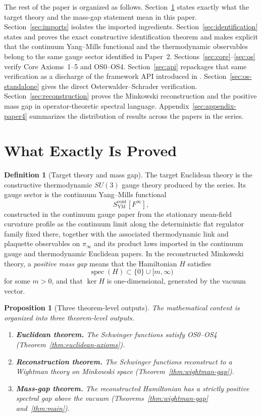 \documentclass[11pt]{article}
\newtheorem{proposition}[theorem]{Proposition}
\theoremstyle{definition}
\newtheorem{definition}[theorem]{Definition}
\theoremstyle{remark}
\newcommand{\spec}{\operatorname{spec}}
\begin{document}
The rest of the paper is organized as follows.
Section~\ref{sec:exactly-proved} states exactly what the target theory and the
mass-gap statement mean in this paper.
Section~\ref{sec:imports} isolates the imported ingredients.
Section~\ref{sec:identification} states and proves the exact constructive
identification theorem and makes explicit that the continuum
Yang--Mills functional and the thermodynamic observables belong to the same
gauge sector identified in Paper~2.
Sections~\ref{sec:core}--\ref{sec:os} verify Core Axioms~1--5 and OS0--OS4.
Section~\ref{sec:api} repackages that same verification as a discharge of the
framework API introduced in \cite{axioms}.
Section~\ref{sec:os-standalone} gives the direct
Osterwalder--Schrader verification.
Section~\ref{sec:reconstruction} proves the Minkowski reconstruction and the
positive mass gap in operator-theoretic spectral language.
Appendix~\ref{sec:appendix-paper4} summarizes the distribution of results across
the papers in the series.

\section{What Exactly Is Proved}
\label{sec:exactly-proved}

\begin{definition}[Target theory and mass gap]
\label{def:target}
The target Euclidean theory is the constructive
thermodynamic $SU(3)$ gauge theory produced by the series.  Its gauge sector is
the continuum Yang--Mills functional
\[
S_{\mathrm{YM}}^{\mathrm{cont}}[F^\infty],
\]
constructed in the continuum gauge paper from the stationary mean-field
curvature profile as the continuum limit along the deterministic flat regulator
family fixed there, together with the associated thermodynamic link and
plaquette observables on $\pi_\infty$ and its product laws imported in the
continuum gauge and thermodynamic Euclidean papers.
In the reconstructed Minkowski theory, a \emph{positive mass gap} means that
the Hamiltonian $H$ satisfies
\[
\spec(H)\subset \{0\}\cup[m,\infty)
\]
for some $m>0$, and that $\ker H$ is one-dimensional, generated by the vacuum
vector.
\end{definition}

\begin{proposition}[Three theorem-level outputs]
\label{prop:three-outputs}
The mathematical content is organized into three
theorem-level outputs.
\begin{enumerate}[label=\textnormal{(\roman*)},leftmargin=1.5em]
\item \textbf{Euclidean theorem.}
The Schwinger functions satisfy OS0--OS4
(Theorem~\ref{thm:euclidean-axioms}).
\item \textbf{Reconstruction theorem.}
The Schwinger functions reconstruct to a Wightman theory on Minkowski space
(Theorem~\ref{thm:wightman-gap}).
\item \textbf{Mass-gap theorem.}
The reconstructed Hamiltonian has a strictly positive spectral gap above the
vacuum (Theorems~\ref{thm:wightman-gap} and~\ref{thm:main}).
\end{enumerate}
\end{proposition}
\end{document}
